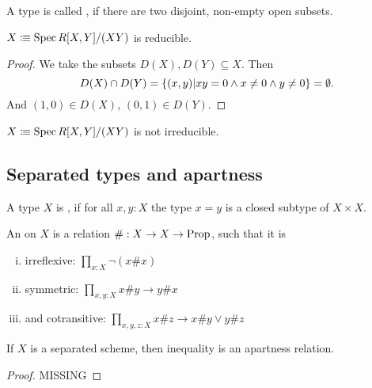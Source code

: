 \begin{definition}
  A type is called , if there are two disjoint, non-empty open subsets.
\end{definition}

\begin{proposition}
  $X\vcentcolon\mspace{-1.2mu}\equiv \operatorname{Spec} R[X,Y]/(XY)$ is reducible.
\end{proposition}

\begin{proof}
  We take the subsets $D(X),D(Y)\subseteq X$.
  Then
  \[ D(X)\cap D(Y)=\{(x,y)\vert xy=0\wedge x\neq 0\wedge y\neq 0\}=\emptyset\rlap{.} \]
  And $(1,0)\in D(X)$, $(0,1)\in D(Y)$.
\end{proof}

\begin{example}
  $X\vcentcolon\mspace{-1.2mu}\equiv \operatorname{Spec} R[X,Y]/(XY)$ is not irreducible.
\end{example}

\subsection{Separated types and apartness}

\begin{definition}
  A type $X$ is , if for all $x,y:X$
  the type $x=y$ is a closed subtype of $X\times X$.
\end{definition}

\begin{definition}
  An  on $X$ is a relation $\#:X\to X\to \mathrm{Prop}$, such that it is
  \begin{enumerate}[(i)]
  \item irreflexive: $\prod_{x:X}\neg(x \# x)$
  \item symmetric: $\prod_{x,y:X} x\# y \to y\# x$
  \item and cotransitive: $\prod_{x,y,z:X} x\# z \to x\# y \vee y\# z$
  \end{enumerate}
\end{definition}

\begin{proposition}
  \label{separated-inequality-apartness}
  If $X$ is a separated scheme, then inequality is an apartness relation.
\end{proposition}

\begin{proof}
  MISSING
\end{proof}
